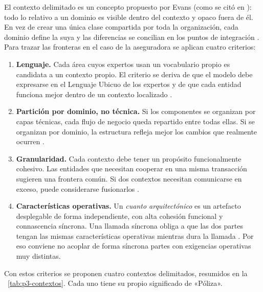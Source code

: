 El contexto delimitado es un concepto propuesto por Evans (como se citó en
\cite[cap.~7]{richardsford2020}): todo lo relativo a un dominio es visible dentro del
contexto y opaco fuera de él. En vez de crear una única clase compartida por toda la
organización, cada dominio define la suya y las diferencias se concilian en los puntos de
integración \parencite[cap.~7]{richardsford2020}. Para trazar las fronteras en el caso de
la aseguradora se aplican cuatro criterios:

\begin{enumerate}[label=\textbf{C\arabic*.}, leftmargin=2.2em]
  \item \textbf{Lenguaje.} Cada área cuyos expertos usan un vocabulario propio es
        candidata a un contexto propio. El criterio se deriva de que el modelo debe
        expresarse en el Lenguaje Ubicuo de los expertos \parencite[21]{delatorre2010} y
        de que cada entidad funciona mejor dentro de un contexto localizado
        \parencite[cap.~7]{richardsford2020}.
  \item \textbf{Partición por dominio, no técnica.} Si los componentes se organizan por
        capas técnicas, cada flujo de negocio queda repartido entre todas ellas. Si se
        organizan por dominio, la estructura refleja mejor los cambios que realmente
        ocurren \parencite[cap.~8]{richardsford2020}.
  \item \textbf{Granularidad.} Cada contexto debe tener un propósito funcionalmente
        cohesivo. Las entidades que necesitan cooperar en una misma transacción sugieren
        una frontera común. Si dos contextos necesitan comunicarse en exceso, puede
        considerarse fusionarlos \parencite[cap.~17]{richardsford2020}.
  \item \textbf{Características operativas.} Un \emph{cuanto arquitectónico} es un
        artefacto desplegable de forma independiente, con alta cohesión funcional y
        connascencia síncrona. Una llamada síncrona obliga a que las dos partes tengan
        las mismas características operativas mientras dura la llamada
        \parencite[cap.~7]{richardsford2020}. Por eso conviene no acoplar de forma
        síncrona partes con exigencias operativas muy distintas.
\end{enumerate}

Con estos criterios se proponen cuatro contextos delimitados, resumidos en la
\tablename~\ref{tab:p3-contextos}. Cada uno tiene su propio significado de «Póliza».

